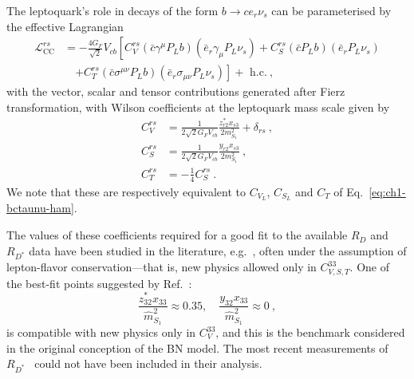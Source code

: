 The leptoquark's role in decays of the form $b \rightarrow c e_r \nu_{s}$ can
be parameterised by the effective Lagrangian~\cite{Sakaki:2013bfa}
\begin{equation}
  \label{eq:ch3-CCHam}
  \begin{split}
    \mathscr{L}^{rs}_{\text{CC}} &= -\frac{4 G_F}{\sqrt{2}} V_{cb} \left[
      C_V^{rs}(\bar{c} \gamma^\mu P_L b)(\bar{e}_r \gamma_\mu P_L
      \nu_{s}) + C^{rs}_S (\bar{c}P_L b)(\bar{e}_r P_L\nu_{s}) \right. \\
    &\quad \left. + C^{rs}_T (\bar{c} \sigma^{\mu \nu} P_L b)
      (\bar{e}_r \sigma_{\mu \nu} P_L \nu_{s})\right] + \text{ h.c.} \ ,
  \end{split}
\end{equation}
with the vector, scalar and tensor contributions generated after Fierz
transformation, with Wilson coefficients at the leptoquark mass scale given by
\begin{subequations} \label{eq:ch3-ccoperators}
  \begin{align}
    C_V^{rs} &= \frac{1}{2 \sqrt{2} G_F V_{cb}} \frac{z_{r2}^* x_{s3}}{2m_{S_{1}}^2} + \delta_{rs} \ , \\
    C_S^{rs} &= \frac{1}{2 \sqrt{2} G_F V_{cb}} \frac{y_{r 2} x_{s 3}}{2m_{S_{1}}^2} \ , \\
    C_T^{rs} &= -\frac{1}{4} C_S^{rs} \ .
  \end{align}
\end{subequations}
We note that these are respectively equivalent to $C_{V_{L}}$, $C_{S_{L}}$ and
$C_{T}$ of Eq.~\eqref{eq:ch1-bctaunu-ham}.

The values of these coefficients required for a good fit to the available $R_D$
and $R_{D^{*}}$ data have been studied in the literature,
e.g.~\cite{Sakaki:2013bfa, Bardhan:2016uhr, Freytsis:2015qca, Choudhury:2016ulr,
  Bhattacharya:2016zcw, Bhattacharya:2015ida}, often under the assumption of
lepton-flavor conservation---that is, new physics allowed only in
$C_{V,S,T}^{33}$. One of the best-fit points suggested by
Ref.~\cite{Freytsis:2015qca}:
\begin{equation} \label{eq:ch3-bfp}
  \frac{z_{32}^* x_{33}}{\hat{m}_{S_{1}}^2} \approx 0.35, \quad \frac{y_{32} x_{33}}{\hat{m}_{S_{1}}^2} \approx 0 \ ,
\end{equation}
is compatible with new physics only in $C_V^{33}$, and this is the benchmark
considered in the original conception of the BN model. The most recent
measurements of $R_{D^*}$~\cite{Hirose:2016wfn, Hirose:2017dxl,
  Abdesselam:2019dgh, Aaij:2017uff, Aaij:2017deq} could not have been included
in their analysis.

